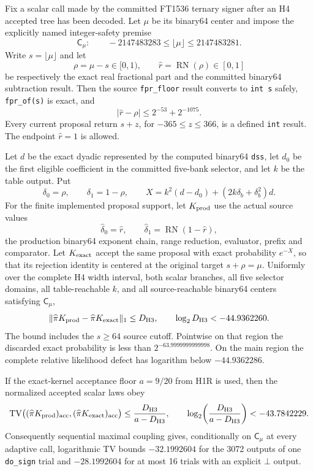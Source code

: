 \begin{theorem}\label{thm:H3-conditional}
Fix a scalar call made by the committed FT1536 ternary signer after an H4
accepted tree has been decoded.  Let $\mu$ be its binary64 center and impose
the explicitly named integer-safety premise
\[
 \mathsf C_\mu:\qquad
 -2147483283\le \lfloor\mu\rfloor\le2147483281.
\]
Write $s=\lfloor\mu\rfloor$ and let
\[
 \rho=\mu-s\in[0,1),\qquad
 \widehat r=\operatorname{RN}(\rho)\in[0,1]
\]
be respectively the exact real fractional part and the committed binary64
subtraction result.  Then the source \texttt{fpr\_floor} result converts to
\texttt{int s} safely, \texttt{fpr\_of(s)} is exact, and
\[
 |\widehat r-\rho|\le 2^{-53}+2^{-1075}.
\]
Every current proposal return $s+z$, for $-365\le z\le366$, is a defined
\texttt{int} result.  The endpoint $\widehat r=1$ is allowed.

Let $d$ be the exact dyadic represented by the computed binary64
\texttt{dss}, let $d_0$ be the first eligible coefficient in the committed
five-bank selector, and let $k$ be the table output.  Put
\[
 \delta_0=\rho,\qquad \delta_1=1-\rho,\qquad
 X=k^2(d-d_0)+(2k\delta_b+\delta_b^2)d.
\]
For the finite implemented proposal support, let $K_{\rm prod}$ use the
actual source values
\[
 \widehat\delta_0=\widehat r,\qquad
 \widehat\delta_1=\operatorname{RN}(1-\widehat r),
\]
the production binary64 exponent chain, range reduction, evaluator, prefix
and comparator.  Let $K_{\rm exact}$ accept the same proposal with exact
probability $e^{-X}$, so that its rejection identity is centered at the
original target $s+\rho=\mu$.  Uniformly over the complete H4 width interval,
both scalar branches, all five selector domains, all table-reachable $k$, and
all source-reachable binary64 centers satisfying $\mathsf C_\mu$,
\[
 \lVert\widehat\pi K_{\rm prod}
       -\widehat\pi K_{\rm exact}\rVert_1
 \le D_{\rm H3},\qquad
 \log_2D_{\rm H3}<-44.9362260.
\]
The bound includes the $s\ge64$ source cutoff.  Pointwise on that region the
discarded exact probability is less than $2^{-63.9999999999998}$.  On the
main region the complete relative likelihood defect has logarithm below
$-44.9362286$.

If the exact-kernel acceptance floor $a=9/20$ from H1R is used, then the
normalized accepted scalar laws obey
\[
 \operatorname{TV}\bigl((\widehat\pi K_{\rm prod})_{\rm acc},
                         (\widehat\pi K_{\rm exact})_{\rm acc}\bigr)
 \le {D_{\rm H3}\over a-D_{\rm H3}},
 \qquad
 \log_2\!\left({D_{\rm H3}\over a-D_{\rm H3}}\right)<-43.7842229.
\]
Consequently sequential maximal coupling gives, conditionally on
$\mathsf C_\mu$ at every adaptive call, logarithmic TV bounds
$-32.1992604$ for the 3072 outputs of one \texttt{do\_sign} trial and
$-28.1992604$ for at most 16 trials with an explicit $\bot$ output.
\end{theorem}


